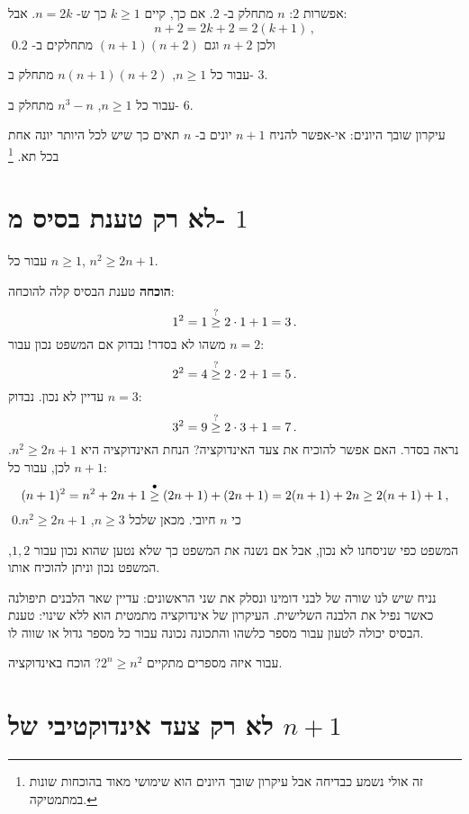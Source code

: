 אפשרות
$2$: $n$
מתחלק ב-%
$2$.
אם כך, קיים
$k\geq 1$
כך ש-%
$n=2k$.
אבל:
\[
n+2 = 2k+2 = 2(k+1)\,,
\]
ולכן
$n+2$
וגם
$(n+1)(n+2)$
מתחלקים ב-%
$2$.\qed

\begin{exercise}\label{e.div3}
עבור כל
$n\geq 1$, $n(n+1)(n+2)$
מתחלק ב-%
$3$.
\end{exercise}

\begin{exercise}\label{e.div6}
עבור כל
$n\geq 1$, $n^3-n$
מתחלק ב-%
$6$.
\end{exercise}

\begin{exercise}
עיקרון שובך היונים: אי-אפשר להניח
$n+1$
יונים ב-%
$n$
תאים כך שיש לכל היותר יונה אחת בכל תא.%
\footnote{%
זה אולי נשמע כבדיחה אבל עיקרון שובך היונים הוא שימושי מאוד בהוכחות שונות במתמטיקה.%
}
\end{exercise}

\section{%
לא רק טענת בסיס מ-%
$1$%
}

\begin{theorem}
עבור כל
$n\geq 1$, $n^2\geq 2n+1$.
\end{theorem}
\textbf{הוכחה}
טענת הבסיס קלה להוכחה:
\[
1^2 = 1 \stackrel{?}{\geq} 2\cdot 1+1 = 3\,.
\]
משהו לא בסדר! נבדוק אם המשפט נכון עבור
$n=2$:
\[
2^2 = 4 \stackrel{?}{\geq} 2\cdot 2+1 = 5\,.
\]
עדיין לא נכון. נבדוק
$n=3$:
\[
3^2 = 9 \stackrel{?}{\geq} 2\cdot 3+1 = 7\,.
\]
נראה בסדר. האם אפשר להוכיח את צעד האינדוקציה? הנחת האינדוקציה היא
$n^2 \geq 2n+1$.
לכן, עבור כל
$n+1$:
\[
(n+1)^2 = n^2 + 2n + 1 \stackrel{\bullet}{\geq}{}
(2n+1)+(2n+1) = 2(n+1) + 2n \geq 2(n+1)+1\,,
\]
כי
$n$
חיובי. מכאן שלכל 
$n\geq 3$, $n^2\geq 2n+1$.\qed

המשפט כפי שניסחנו לא נכון, אבל אם נשנה את המשפט כך שלא נטען שהוא נכון עבור
$1,2$,
המשפט נכון וניתן להוכיח אותו.

נניח שיש לנו שורה של לבני דומינו ונסלק את שני הראשונים: עדיין שאר הלבנים תיפולנה כאשר נפיל את הלבנה השלישית. העיקרון של אינדוקציה מתמטית הוא ללא שינוי: טענת הבסיס יכולה לטעון עבור מספר כלשהו והתכונה נכונה עבור כל מספר גדול או שווה לו.

\begin{exercise}
עבור איזה מספרים מתקיים
$2^n\geq n^2$?
הוכח באינדוקציה.
\end{exercise}

\section{%
לא רק צעד אינדוקטיבי של
$n+1$}

